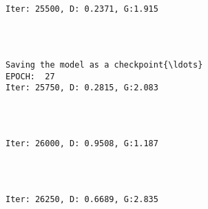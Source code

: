 \documentclass[11pt]{article}
\begin{document}
    \begin{center}
    \end{center}
    { \hspace*{\fill} \\}
    
    \begin{Verbatim}[commandchars=\\\{\}]

Iter: 25500, D: 0.2371, G:1.915
    \end{Verbatim}

    \begin{center}
    \end{center}
    { \hspace*{\fill} \\}
    
    \begin{Verbatim}[commandchars=\\\{\}]

Saving the model as a checkpoint{\ldots}
EPOCH:  27
Iter: 25750, D: 0.2815, G:2.083
    \end{Verbatim}

    \begin{center}
    \end{center}
    { \hspace*{\fill} \\}
    
    \begin{Verbatim}[commandchars=\\\{\}]

Iter: 26000, D: 0.9508, G:1.187
    \end{Verbatim}

    \begin{center}
    \end{center}
    { \hspace*{\fill} \\}
    
    \begin{Verbatim}[commandchars=\\\{\}]

Iter: 26250, D: 0.6689, G:2.835
    \end{Verbatim}
\end{document}

